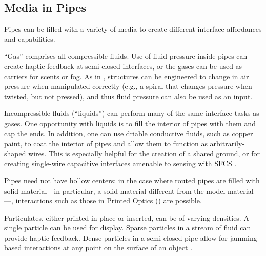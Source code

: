 
\subsection{Media in Pipes}

Pipes can be filled with a variety of media to create different interface affordances and capabilities.

``Gas'' comprises all compressible fluids.  Use of fluid pressure inside pipes can create haptic feedback at semi-closed interfaces, or the gases can be used as carriers for scents or fog.  As in \cite{Slyper-pressure}, structures can be engineered to change in air pressure when manipulated correctly (e.g., a spiral that changes pressure when twisted, but not pressed), and thus fluid pressure can also be used as an input.  

Incompressible fluids (``liquids'') can perform many of the same interface tasks as gases.  One opportunity with liquids is to fill the interior of pipes with them and cap the ends.  In addition, one can use driable conductive fluids, such as copper paint, to coat the interior of pipes and allow them to function as arbitrarily-shaped wires.  This is especially helpful for the creation of a shared ground, or for creating single-wire capacitive interfaces amenable to sensing with SFCS \cite{Sato-touche}.

Pipes need not have hollow centers: in the case where routed pipes are filled with solid material---in particular, a solid material different from the model material---, interactions such as those in Printed Optics (\cite{Willis-printedoptics}) are possible.

Particulates, either printed in-place or inserted, can be of varying densities.  A single particle can be used for display.  Sparse particles in a stream of fluid can provide haptic feedback.  Dense particles in a semi-closed pipe allow for jamming-based interactions at any point on the surface of an object \cite{Follmer-jamming} .

